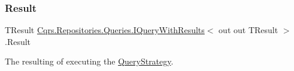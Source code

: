 \subsubsection{\texorpdfstring{Result}{Result}}
{\footnotesize\ttfamily T\+Result \hyperlink{interfaceCqrs_1_1Repositories_1_1Queries_1_1IQueryWithResults}{Cqrs.\+Repositories.\+Queries.\+I\+Query\+With\+Results}$<$ out out T\+Result $>$.Result\hspace{0.3cm}{\ttfamily [get]}}



The resulting of executing the \hyperlink{classCqrs_1_1Repositories_1_1Queries_1_1QueryStrategy}{Query\+Strategy}. 

